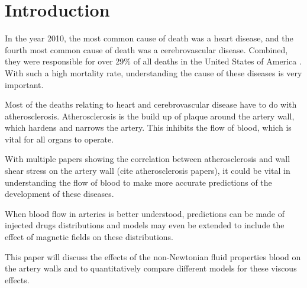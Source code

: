 \section{Introduction}
In the year 2010, the most common cause of death was a heart disease, and the fourth most common cause of death was a cerebrovascular disease. Combined, they were responsible for over 29\% of all deaths in the United States of America \cite{nvss}. With such a high mortality rate, understanding the cause of these diseases is very important. 

Most of the deaths relating to heart and cerebrovascular disease have to do with atherosclerosis. Atherosclerosis is the build up of plaque around the artery wall, which hardens and narrows the artery. This inhibits the flow of blood, which is vital for all organs to operate.

With multiple papers showing the correlation between atherosclerosis and wall shear stress on the artery wall (cite atherosclerosis papers), it could be vital in understanding the flow of blood to make more accurate predictions of the development of these diseases. 

When blood flow in arteries is better understood, predictions can be made of injected drugs distributions and models may even be extended to include the effect of magnetic fields on these distributions. 






This paper will discuss the effects of the non-Newtonian fluid properties blood on the artery walls and to quantitatively compare different models for these viscous effects. 